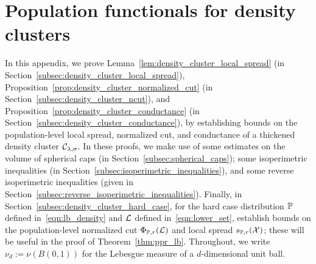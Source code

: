 \section{Population functionals for density clusters}
\label{apdx:density_cluster_population_functionals}
In this appendix, we prove Lemma~\ref{lem:density_cluster_local_spread} (in Section~\ref{subsec:density_cluster_local_spread}), Proposition~\ref{prop:density_cluster_normalized_cut} (in Section~\ref{subsec:density_cluster_ncut}), and Proposition~\ref{prop:density_cluster_conductance} (in Section~\ref{subsec:density_cluster_conductance}), by establishing bounds on the population-level local spread, normalized cut, and conductance of a thickened density cluster $\mathcal{C}_{\lambda,\sigma}$. In these proofs, we make use of some estimates on the volume of spherical caps (in Section~\ref{subsec:spherical_caps}); some isoperimetric inequalities (in Section~\ref{subsec:isoperimetric_inequalities}), and some reverse isoperimetric inequalities (given in Section~\ref{subsec:reverse_isoperimetric_inequalities}). Finally, in Section~\ref{subsec:density_cluster_hard_case}, for the hard case distribution $\mathbb{P}$ defined in~\eqref{eqn:lb_density} and $\mathcal{L}$ defined in~\eqref{eqn:lower_set}, establish bounds on the population-level normalized cut $\Phi_{\mathbb{P},r}(\mathcal{L})$ and local spread $s_{\mathbb{P},r}(\mathcal{X})$; these will be useful in the proof of Theorem~\ref{thm:ppr_lb}. Throughout, we write $\nu_d := \nu(B(0,1))$ for the Lebesgue measure of a $d$-dimensional unit ball.

